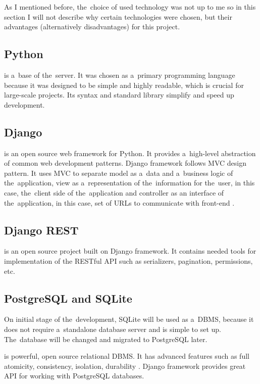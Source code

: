 As I mentioned before, the~choice of used technology was not up to me so in this section I will not describe why certain
technologies were chosen, but their advantages (alternatively disadvantages) for this project.


\subsection{Python}
 is a~base of the~server. It was chosen as a~primary programming language because it was designed to
be simple and highly readable, which is crucial for large-scale projects. Its syntax and standard library simplify and
speed up development.

\subsection{Django}
 is an open source web framework for Python. It provides a~high-level abstraction of common web
development patterns. Django framework follows \ac{MVC} design pattern. It uses \ac{MVC} to separate model as a~data and
a~business logic of the~application, view as a~representation of the~information for the~user, in this case, the~client
side of the~application and controller as an interface of the~application, in this case, set of \ac{URL}s to communicate
with front-end \cite{django}.

\subsection{Django REST}
 is an open source project built on Django framework. It contains needed tools for
implementation of the \ac{REST}ful \ac{API} such as serializers, pagination, permissions, etc.

\subsection{PostgreSQL and SQLite}
On initial stage of the~development, SQLite will be used as a~\ac{DBMS}, because it does not require a~standalone
database server and is simple to set up. The~database will be changed and migrated to PostgreSQL later.

 is powerful, open source relational \ac{DBMS}. It has advanced features such as full atomicity,
consistency, isolation, durability \cite{postgres}. Django framework provides great \ac{API} for working with PostgreSQL
databases.

